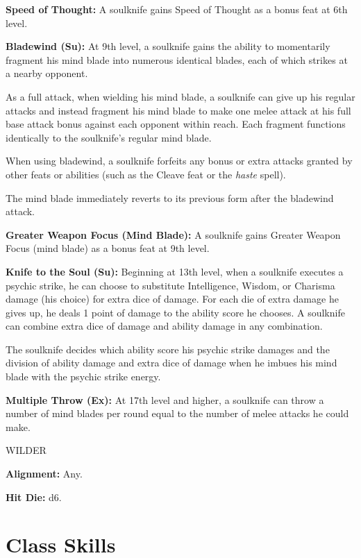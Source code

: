 \documentclass{article}
\begin{document}
\textbf{Speed of Thought: }A soulknife gains Speed of Thought as a bonus feat at 
6th level.

\textbf{Bladewind (Su):} At 9th level, a soulknife gains the ability to momentarily 
fragment his mind blade into numerous identical blades, each of which strikes at 
a nearby opponent.

As a full attack, when wielding his mind blade, a soulknife can give up his regular 
attacks and instead fragment his mind blade to make one melee attack at his full 
base attack bonus against each opponent within reach. Each fragment functions identically 
to the soulknife's regular mind blade.

When using bladewind, a soulknife forfeits any bonus or extra attacks granted by 
other feats or abilities (such as the Cleave feat or the \textit{haste }spell).

The mind blade immediately reverts to its previous form after the bladewind attack.

\textbf{Greater Weapon Focus (Mind Blade):} A soulknife gains Greater Weapon Focus 
(mind blade) as a bonus feat at 9th level.

\textbf{Knife to the Soul (Su):} Beginning at 13th level, when a soulknife executes 
a psychic strike, he can choose to substitute Intelligence, Wisdom, or Charisma 
damage (his choice) for extra dice of damage. For each die of extra damage he gives 
up, he deals 1 point of damage to the ability score he chooses. A soulknife can 
combine extra dice of damage and ability damage in any combination.

The soulknife decides which ability score his psychic strike damages and the division 
of ability damage and extra dice of damage when he imbues his mind blade with the 
psychic strike energy.

\textbf{Multiple Throw (Ex): }At 17th level and higher, a soulknife can throw a 
number of mind blades per round equal to the number of melee attacks he could make.

\vspace{12pt}
{\LARGE{}WILDER}

\textbf{Alignment:} Any.

\textbf{Hit Die:} d6.

\vspace{12pt}
\section*{\textbf{Class Skills}}
\end{document}

